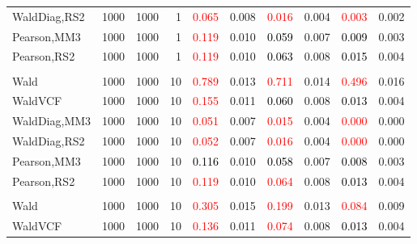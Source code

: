 \documentclass[
]{article}
\begin{document}
\begin{table}[H]
{\begin{tabular}[t]{lrrrrrrlrr}
\hspace{1em}WaldDiag,RS2 & 1000 & 1000 & 1 & \textcolor{red}{0.065} & 0.008 & \textcolor{red}{0.016} & 0.004 & \textcolor{red}{0.003} & 0.002\\
\hspace{1em}Pearson,MM3 & 1000 & 1000 & 1 & \textcolor{red}{0.119} & 0.010 & \textcolor{black}{0.059} & 0.007 & \textcolor{black}{0.009} & 0.003\\
\hspace{1em}Pearson,RS2 & 1000 & 1000 & 1 & \textcolor{red}{0.119} & 0.010 & \textcolor{black}{0.063} & 0.008 & \textcolor{black}{0.015} & 0.004\\
\addlinespace[0.3em]
\multicolumn{10}{l}{\textbf{1F 15V}}\\
\hspace{1em}Wald & 1000 & 1000 & 10 & \textcolor{red}{0.789} & 0.013 & \textcolor{red}{0.711} & 0.014 & \textcolor{red}{0.496} & 0.016\\
\hspace{1em}WaldVCF & 1000 & 1000 & 10 & \textcolor{red}{0.155} & 0.011 & \textcolor{black}{0.060} & 0.008 & \textcolor{black}{0.013} & 0.004\\
\hspace{1em}WaldDiag,MM3 & 1000 & 1000 & 10 & \textcolor{red}{0.051} & 0.007 & \textcolor{red}{0.015} & 0.004 & \textcolor{red}{0.000} & 0.000\\
\hspace{1em}WaldDiag,RS2 & 1000 & 1000 & 10 & \textcolor{red}{0.052} & 0.007 & \textcolor{red}{0.016} & 0.004 & \textcolor{red}{0.000} & 0.000\\
\hspace{1em}Pearson,MM3 & 1000 & 1000 & 10 & \textcolor{black}{0.116} & 0.010 & \textcolor{black}{0.058} & 0.007 & \textcolor{black}{0.008} & 0.003\\
\hspace{1em}Pearson,RS2 & 1000 & 1000 & 10 & \textcolor{red}{0.119} & 0.010 & \textcolor{red}{0.064} & 0.008 & \textcolor{black}{0.013} & 0.004\\
\addlinespace[0.3em]
\multicolumn{10}{l}{\textbf{2F 10V}}\\
\hspace{1em}Wald & 1000 & 1000 & 10 & \textcolor{red}{0.305} & 0.015 & \textcolor{red}{0.199} & 0.013 & \textcolor{red}{0.084} & 0.009\\
\hspace{1em}WaldVCF & 1000 & 1000 & 10 & \textcolor{red}{0.136} & 0.011 & \textcolor{red}{0.074} & 0.008 & \textcolor{black}{0.013} & 0.004\\

\end{tabular}}
\end{table}
\end{document}

